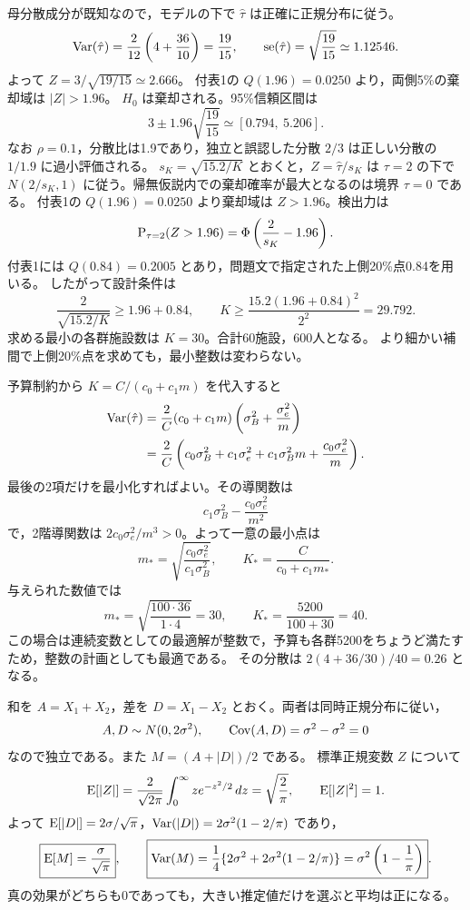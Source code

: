 \documentclass[a4paper,11pt]{ltjsarticle}
\begin{document}
母分散成分が既知なので，モデルの下で $\hat\tau$ は正確に正規分布に従う。
\[
\operatorname{Var}(\hat\tau)=\frac2{12}\left(4+\frac{36}{10}\right)=\frac{19}{15},\qquad
\operatorname{se}(\hat\tau)=\sqrt{\frac{19}{15}}\simeq1.12546.
\]
よって $Z=3/\sqrt{19/15}\simeq2.666$。
付表1の $Q(1.96)=0.0250$ より，両側5\%の棄却域は $|Z|>1.96$。
$H_0$ は棄却される。95\%信頼区間は
\[
3\pm1.96\sqrt{\frac{19}{15}}\simeq\boxed{[0.794,\ 5.206]}.
\]
なお $\rho=0.1$，分散比は1.9であり，独立と誤認した分散 $2/3$ は正しい分散の $1/1.9$ に過小評価される。
\newpage
{}
$s_K=\sqrt{15.2/K}$ とおくと，$Z=\hat\tau/s_K$ は $\tau=2$ の下で
$N(2/s_K,1)$ に従う。帰無仮説内での棄却確率が最大となるのは境界 $\tau=0$ である。
付表1の $Q(1.96)=0.0250$ より棄却域は $Z>1.96$。検出力は
\[
\operatorname{P}_{\tau=2}(Z>1.96)=\Phi\left(\frac2{s_K}-1.96\right).
\]
付表1には $Q(0.84)=0.2005$ とあり，問題文で指定された上側20\%点0.84を用いる。
したがって設計条件は
\[
\frac2{\sqrt{15.2/K}}\geq1.96+0.84,
\qquad
K\geq\frac{15.2(1.96+0.84)^2}{2^2}=29.792.
\]
求める最小の各群施設数は $\boxed{K=30}$。合計60施設，600人となる。
より細かい補間で上側20\%点を求めても，最小整数は変わらない。

予算制約から $K=C/(c_0+c_1m)$ を代入すると
\begin{align*}
\operatorname{Var}(\hat\tau)
&=\frac2C(c_0+c_1m)\left(\sigma_B^2+\frac{\sigma_e^2}{m}\right)\\
&=\frac2C\left(c_0\sigma_B^2+c_1\sigma_e^2+c_1\sigma_B^2m+
\frac{c_0\sigma_e^2}{m}\right).
\end{align*}
最後の2項だけを最小化すればよい。その導関数は
\[
c_1\sigma_B^2-\frac{c_0\sigma_e^2}{m^2}
\]
で，2階導関数は $2c_0\sigma_e^2/m^3>0$。よって一意の最小点は
\[
\boxed{m_* =\sqrt{\frac{c_0\sigma_e^2}{c_1\sigma_B^2}}},\qquad
\boxed{K_* =\frac C{c_0+c_1m_*}}.
\]
与えられた数値では
\[
m_*=\sqrt{\frac{100\cdot36}{1\cdot4}}=\boxed{30},\qquad
K_* =\frac{5200}{100+30}=\boxed{40}.
\]
この場合は連続変数としての最適解が整数で，予算も各群5200をちょうど満たすため，整数の計画としても最適である。
その分散は $2(4+36/30)/40=0.26$ となる。
\newpage

和を $A=X_1+X_2$，差を $D=X_1-X_2$ とおく。両者は同時正規分布に従い，
\[
A,D\sim N(0,2\sigma^2),\qquad \operatorname{Cov}(A,D)=\sigma^2-\sigma^2=0
\]
なので独立である。また $M=(A+|D|)/2$ である。
標準正規変数 $Z$ について
\[
\operatorname{E}[|Z|]=\frac2{\sqrt{2\pi}}\int_0^\infty z e^{-z^2/2}\,dz
=\sqrt{\frac2\pi},\qquad \operatorname{E}[|Z|^2]=1.
\]
よって $\operatorname{E}[|D|]=2\sigma/\sqrt\pi$，$\operatorname{Var}(|D|)=2\sigma^2(1-2/\pi)$ であり，
\[
\boxed{\operatorname{E}[M]=\frac\sigma{\sqrt\pi}},\qquad
\boxed{\operatorname{Var}(M)=\frac14\{2\sigma^2+2\sigma^2(1-2/\pi)\}
=\sigma^2\left(1-\frac1\pi\right)}.
\]
真の効果がどちらも0であっても，大きい推定値だけを選ぶと平均は正になる。
\end{document}
